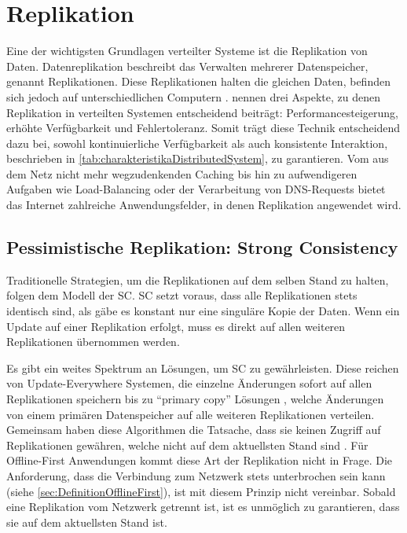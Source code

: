 \documentclass[a4paper, 12pt]{scrreprt}
\begin{document}
\section{Replikation}

Eine der wichtigsten Grundlagen verteilter Systeme ist die Replikation von Daten. Datenreplikation beschreibt das Verwalten mehrerer Datenspeicher, genannt Replikationen. Diese Replikationen halten die gleichen Daten, befinden sich jedoch auf unterschiedlichen Computern \autocite[S.42]{ArticleOptimisticReplication}. \citet{BookDistributedSystemsConceptsAndDesign} nennen drei Aspekte, zu denen Replikation in verteilten Systemen entscheidend beiträgt: Performancesteigerung, erhöhte Verfügbarkeit und Fehlertoleranz. Somit trägt diese Technik entscheidend dazu bei, sowohl kontinuierliche Verfügbarkeit als auch konsistente Interaktion, beschrieben in \ref{tab:charakteristikaDistributedSystem}, zu garantieren. Vom aus dem Netz nicht mehr wegzudenkenden Caching bis hin zu aufwendigeren Aufgaben wie Load-Balancing oder der Verarbeitung von DNS-Requests bietet das Internet zahlreiche Anwendungsfelder, in denen Replikation angewendet wird. 

\subsection{Pessimistische Replikation: Strong Consistency}

Traditionelle Strategien, um die Replikationen auf dem selben Stand zu halten, folgen dem Modell der \ac{SC}. \ac{SC} setzt voraus, dass alle Replikationen stets identisch sind, als gäbe es konstant nur eine singuläre Kopie der Daten. Wenn ein Update auf einer Replikation erfolgt, muss es direkt auf allen weiteren Replikationen übernommen werden. 

Es gibt ein weites Spektrum an Lösungen, um \ac{SC} zu gewährleisten. Diese reichen von {Update-Everywhere} Systemen, die einzelne Änderungen sofort auf allen Replikationen speichern \autocite{ThesisUpdateEverywhere} bis zu \enquote{primary copy} Lösungen \autocite[S.14]{BookPrimaryReplica}, welche Änderungen von einem primären Datenspeicher auf alle weiteren Replikationen verteilen. Gemeinsam haben diese Algorithmen die Tatsache, dass sie keinen Zugriff auf Replikationen gewähren, welche nicht auf dem aktuellsten Stand sind \autocite[S.43]{ArticleOptimisticReplication}. Für Offline-First Anwendungen kommt diese Art der Replikation nicht in Frage. Die Anforderung, dass die Verbindung zum Netzwerk stets unterbrochen sein kann (siehe \ref{sec:DefinitionOfflineFirst}), ist mit diesem Prinzip nicht vereinbar. Sobald eine Replikation vom Netzwerk getrennt ist, ist es unmöglich zu garantieren, dass sie auf dem aktuellsten Stand ist.
\end{document}
